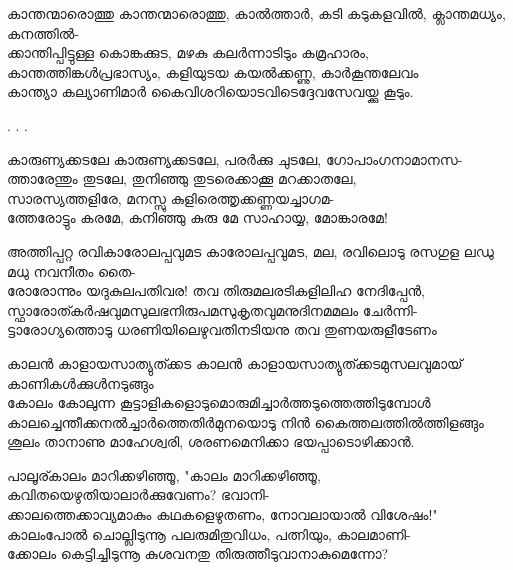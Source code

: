 \begin{enumerate}




\begin{slokam}{\VSr}{\KKT}{കാന്തന്മാരൊത്തു}
കാന്തന്മാരൊത്തു, കാൽത്താർ, കടി കടുകളവിൽ, ക്ലാന്തമധ്യം, കനത്തിൽ-\\
ക്കാന്തിപ്പിട്ടുള്ള കൊങ്കക്കുട, മഴകു കലർന്നാടിടും കമ്രഹാരം,\\
കാന്തത്തിങ്കള്‍പ്രഭാസ്യം, കളിയുടയ കയൽക്കണ്ണു, കാർകൂന്തലേവം\\
കാന്ത്യാ കല്യാണിമാർ കൈവിശറിയൊടവിടെദ്ദേവസേവയ്ക്കു കൂടും.
\end{slokam}



.
.
.

\begin{slokam}{\VSv}{\VKG}{കാരുണ്യക്കടലേ}
കാരുണ്യക്കടലേ, പരർക്കു ചുടലേ, ഗോപാംഗനാമാനസ-\\
ത്താരേന്തും തുടലേ, തുനിഞ്ഞു തുടരെക്കാക്കൂ മറക്കാതലേ,\\
സാരസ്യത്തളിരേ, മനസ്സു കുളിരെത്തൃക്കണ്ണയച്ചാഗമ-\\
ത്തേരോട്ടും കരമേ, കനിഞ്ഞു കുരു മേ സാഹായ്യ, മോങ്കാരമേ!
\end{slokam}


\begin{slokam}{\VOth}{അത്തിപ്പറ്റ രവി}{കാരോലപ്പവുമട}
കാരോലപ്പവുമട, മല, രവിലൊടു രസഗുള ലഡു മധു നവനീതം തൈ-\\
രോരോന്നും യദുകുലപതിവര! തവ തിരുമലരടികളിലിഹ നേദിപ്പേൻ,\\
സ്ഫാരോത്കർഷവുമസുലഭനിരുപമസുകൃതവുമനുദിനമമലം ചേർന്നി-\\
ട്ടാരോഗ്യത്തൊടു ധരണിയിലെഴുവതിനടിയനു തവ തുണയരുളീടേണം
\end{slokam}


\begin{slokam}{\VSr}{\VNM}{കാലൻ കാളായസാത്യുത്ക്കട}
കാലൻ കാളായസാത്യുത്ക്കടമുസലവുമായ്‌ കാണികള്‍ക്കുള്‍നടുങ്ങും\\
കോലം കോലുന്ന കൂട്ടാളികളൊടുമൊരുമിച്ചാർത്തടുത്തെത്തിടുമ്പോള്‍\\
കാലച്ചെന്തീക്കനൽച്ചാർത്തെതിർമുനയൊടു നിൻ കൈത്തലത്തിൽത്തിളങ്ങും\\
ശൂലം താനാണു മാഹേശ്വരി, ശരണമെനിക്കാ ഭയപ്പാടൊഴിക്കാൻ.
\end{slokam}


\begin{slokam}{\VSr}{പാലൂര്}{കാലം മാറിക്കഴിഞ്ഞൂ,}
"കാലം മാറിക്കഴിഞ്ഞൂ, കവിതയെഴുതിയാലാർക്കുവേണം? ഭവാനി-\\
ക്കാലത്തെക്കാവ്യമാകും കഥകളെഴുതണം, നോവലായാൽ വിശേഷം!" \\
കാലംപോൽ ചൊല്ലിടുന്നൂ പലരുമിതുവിധം, പത്നിയും, കാലമാണി-\\
ക്കോലം കെട്ടിച്ചിടുന്നൂ കുശവനതു തിരുത്തീടുവാനാകുമെന്നോ?
\end{slokam}


\end{enumerate}
